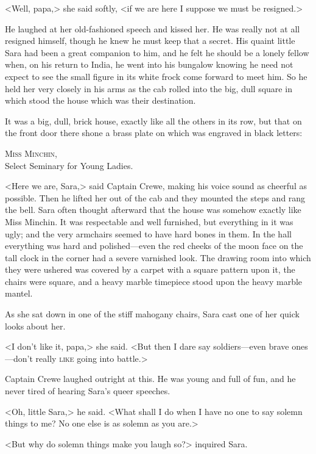<Well, papa,> she said softly, <if we are here I suppose we must be resigned.>

He laughed at her old-fashioned speech and kissed her. He was really not at all resigned himself, though he knew he must keep that a secret. His quaint little Sara had been a great companion to him, and he felt he should be a lonely fellow when, on his return to India, he went into his bungalow knowing he need not expect to see the small figure in its white frock come forward to meet him. So he held her very closely in his arms as the cab rolled into the big, dull square in which stood the house which was their destination.

It was a big, dull, brick house, exactly like all the others in its row, but that on the front door there shone a brass plate on which was engraved in black letters:

\begin{center}
\textsc{Miss Minchin},\\
Select Seminary for Young Ladies.
\end{center}

<Here we are, Sara,> said Captain Crewe, making his voice sound as cheerful as possible. Then he lifted her out of the cab and they mounted the steps and rang the bell. Sara often thought afterward that the house was somehow exactly like Miss Minchin. It was respectable and well furnished, but everything in it was ugly; and the very armchairs seemed to have hard bones in them. In the hall everything was hard and polished—even the red cheeks of the moon face on the tall clock in the corner had a severe varnished look. The drawing room into which they were ushered was covered by a carpet with a square pattern upon it, the chairs were square, and a heavy marble timepiece stood upon the heavy marble mantel.

As she sat down in one of the stiff mahogany chairs, Sara cast one of her quick looks about her.

<I don't like it, papa,> she said. <But then I dare say soldiers—even brave ones—don't really \textsc{like} going into battle.>

Captain Crewe laughed outright at this. He was young and full of fun, and he never tired of hearing Sara's queer speeches.

<Oh, little Sara,> he said. <What shall I do when I have no one to say solemn things to me? No one else is as solemn as you are.>

<But why do solemn things make you laugh so?> inquired Sara.

